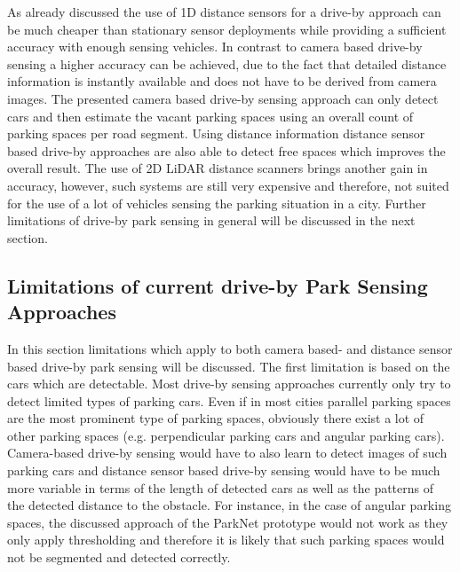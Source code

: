 As already discussed the use of 1D distance sensors for a drive-by approach can be much cheaper than stationary sensor deployments while providing a sufficient accuracy with enough sensing vehicles. In contrast to camera based drive-by sensing a higher accuracy can be achieved, due to the fact that detailed distance information is  instantly available and does not have to be derived from camera images. The presented camera based drive-by sensing approach can only detect cars and then estimate the vacant parking spaces using an overall count of parking spaces per road segment. Using distance information distance sensor based drive-by approaches are also able to detect free spaces which improves the overall result. The use of 2D LiDAR distance scanners brings another gain in accuracy, however, such systems are still very expensive and therefore, not suited for the use of a lot of vehicles sensing the parking situation in a city. Further limitations of drive-by park sensing in general will be discussed in the next section.


\subsection{Limitations of current drive-by Park Sensing Approaches}
\label{sec:limitations_driveby_sensing}

In this section limitations which apply to both camera based- and distance sensor based drive-by park sensing will be discussed. The first limitation is based on the cars which are detectable. Most drive-by sensing approaches currently only try to detect limited types of parking cars. Even if in most cities parallel parking spaces are the most prominent type of parking spaces, obviously there exist a lot of other parking spaces (e.g. perpendicular parking cars and angular parking cars). Camera-based drive-by sensing would have to also learn to detect images of such parking cars and distance sensor based drive-by sensing would have to be much more variable in terms of the length of detected cars as well as the patterns of the detected distance to the obstacle. For instance, in the case of angular parking spaces, the discussed approach of the ParkNet prototype would not work as they only apply thresholding and therefore it is likely that such parking spaces would not be segmented and detected correctly.

